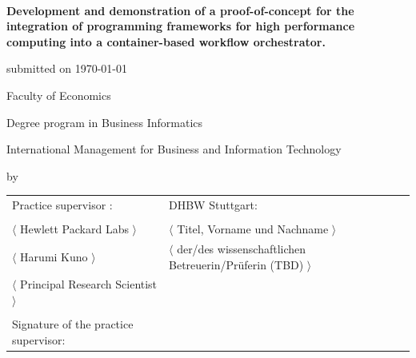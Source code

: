 \begin{spacing}{1}
\begin{center}	
~\vspace{0mm}

{\sffamily
\large  
\textbf{
    Development and demonstration of a proof-of-concept for the integration of programming frameworks for high performance computing into a container-based workflow orchestrator.
    }
\bigskip
\textbf{}
}


\vspace{15mm}

{\Large \typMeinerArbeit}

\vspace{1cm}

submitted on \today 

\vspace{15mm}

Faculty of Economics
\medskip

Degree program in Business Informatics

\medskip

International Management for Business and Information Technology 

\vspace{10mm}

by

\vspace{10mm}
    
{\large\textsc{\meinName}}

\vspace{10mm}
\end{center}

\vfill

\begin{tabular}{ll}
Practice supervisor : & DHBW Stuttgart: \\
\hspace{0.4\linewidth} & \\
$\langle$ Hewlett Packard Labs $\rangle$ & $\langle$ Titel, Vorname und Nachname $\rangle$ \\
$\langle$ Harumi Kuno $\rangle$ 
& $\langle$ der/des wissenschaftlichen Betreuerin/Prüferin (TBD) $\rangle$ \\
$\langle$ Principal Research Scientist $\rangle$ \\
\\
Signature of the practice supervisor: \\
\end{tabular}


\vspace{1cm}
\end{spacing}

